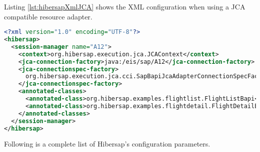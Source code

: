 Listing \ref{lst:hibersapXmlJCA} shows the XML configuration when using a JCA compatible resource adapter. 

\begin{lstlisting}[language=XML,caption=hibersap.xml for use with JCA,label=lst:hibersapXmlJCA]
<?xml version="1.0" encoding="UTF-8"?>
<hibersap>
  <session-manager name="A12">
    <context>org.hibersap.execution.jca.JCAContext</context>
    <jca-connection-factory>java:/eis/sap/A12</jca-connection-factory>
    <jca-connectionspec-factory>
      org.hibersap.execution.jca.cci.SapBapiJcaAdapterConnectionSpecFactory
    </jca-connectionspec-factory>
    <annotated-classes>
      <annotated-class>org.hibersap.examples.flightlist.FlightListBapi</annotated-class>
      <annotated-class>org.hibersap.examples.flightdetail.FlightDetailBapi</annotated-class>
    </annotated-classes>    
  </session-manager>
</hibersap>
\end{lstlisting}
\pagebreak
Following is a complete list of Hibersap's configuration parameters.
\\ \\
